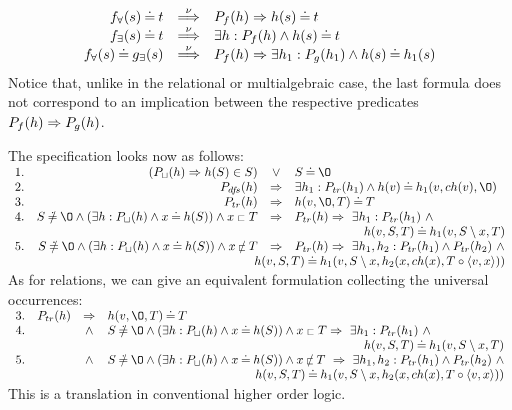 \begin{equation}\label{eq:predsnu}
\begin{array}{rcl}
f_\forall(s) \mathbin{\doteq} t & \mathbin{\stackrel{\nu}{\Longrightarrow}} & P_{f}(h)\mathrel\Rightarrow h(s)\mathbin{\doteq} t \\ f_\exists(s) \mathbin{\doteq} t & \mathbin{\stackrel{\nu}{\Longrightarrow}} & \exists h: P_{f}(h)\land h(s)\mathbin{\doteq} t\\ f_\forall(s) \mathbin{\doteq} g_\exists(s) & \mathbin{\stackrel{\nu}{\Longrightarrow}} &
P_{f}(h)\mathrel\Rightarrow \exists h_1 :P_{g}(h_1)\land h(s)\mathbin{\doteq} h_1(s) \\ \end{array}
\end{equation}
Notice that, unlike in the relational or multialgebraic case, the last formula does not correspond to an implication between the respective predicates $P_{f}(h)\mathrel\Rightarrow P_{g}(h)$. 

The specification looks now as follows:\\[1ex] \(\begin{array}{rrcl}
1.& (\Pre P\ch(h) \impl h(S)\in S)& \lor & S\Eq\es \\ 2. & \Pre P{\dfs}(h) & \impl
&\exists h_1: \Pre P{tr}(h_1)\land h(v)\Eq h_1(v,ch(v),\es)\ \ \\ 3. & \Pre P{tr}(h) & \impl & h(v,\es,T)\Eq T \\ 4. & S\Not\Eq\es\land (\exists h :\Pre P\ch(h)\land x\Eq h(S))\land x\lin T & \impl & \Pre P{tr}(h)\impl\ \exists h_1 :\Pre P{tr}(h_1)\ \land \\ \multicolumn{4}{r}{ h(v,S,T)\Eq h_1(v,S\setminus x,T)} \\ 5.& S\Not\Eq\es\land (\exists h :\Pre P\ch(h)\land x\Eq h(S))\land x\Not\lin T
& \impl & \Pre P{tr}(h) \impl\ \exists h_1,h_2 : \Pre P{tr}(h_1)\land\Pre 
P{tr}(h_2)\ \land \\
\multicolumn{4}{r}{h(v,S,T)\Eq h_1(v,S\setminus x,h_2(x,ch(x),T\ap\<v,x\>))} \end{array} \)\\[1ex]
\noindent
As for relations, we can give an equivalent formulation collecting the universal occurrences:\\[1ex]
\(\begin{array}{rrcl}
3. & \Pre P{tr}(h) & \impl & h(v,\es,T)\Eq T\ \\ 4.& &\land & S\Not\Eq\es\land (\exists h :\Pre P\ch(h)\land x\Eq h(S))\land x\lin T
\impl\ \exists h_1:\Pre P{tr}(h_1)\ \land \\ \multicolumn{4}{r}{ h(v,S,T)\Eq h_1(v,S\setminus x,T)} \\ 5.& &\land & S\Not\Eq\es\land (\exists h :\Pre P\ch(h)\land x\Eq h(S))\land x\Not\lin T\ \impl\ \exists h_1,h_2: \Pre P{tr}(h_1)\land\Pre P{tr}(h_2)\ \land \\
\multicolumn{4}{r}{h(v,S,T)\Eq h_1(v,S\setminus x,h_2(x,ch(x),T\ap\<v,x\>))} \end{array} \)\\[1ex]
\noindent
This is a translation in conventional higher order logic. 

